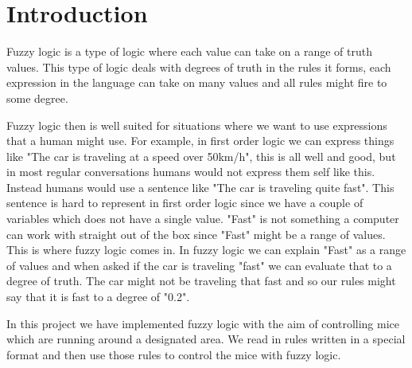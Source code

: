 \section{Introduction}\label{intro}
Fuzzy logic is a type of logic where each value can take on a range of truth values.
This type of logic deals with degrees of truth in the rules it forms, each expression
in the language can take on many values and all rules might fire to some degree.

Fuzzy logic then is well suited for situations where we want to use expressions that
a human might use. For example, in first order logic we can express things like "The
car is traveling at a speed over 50km/h", this is all well and good, but in most regular
conversations humans would not express them self like this. Instead humans would use
a sentence like "The car is traveling quite fast". This sentence is hard to represent
in first order logic since we have a couple of variables which does not have a single 
value. "Fast" is not something a computer can work with straight out of the box since 
"Fast" might be a range of values. This is where fuzzy logic comes in. In fuzzy logic
we can explain "Fast" as a range of values and when asked if the car is traveling "fast"
we can evaluate that to a degree of truth. The car might not be traveling that fast and
so our rules might say that it is fast to a degree of "0.2".

In this project we have implemented fuzzy logic with the aim of controlling mice which
are running around a designated area. We read in rules written in a special format  and then use those rules to control the mice with fuzzy logic.
